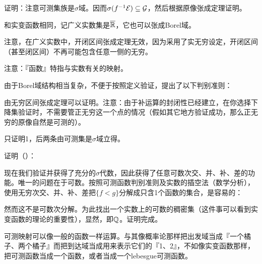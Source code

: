 证明：注意可测集族是$\sigma$域。因而$\sigma(f^{-1}\mbox{$\mathcal{E}$})\subseteq\mbox{$\mathcal{G}$}$，然后根据原像张成定理证明。


和实变函数相同，记广义实数集是$\overline{\mbox{$\mathbb R$}}$，它也可以张成Borel域。

注意，在广义实数中，开闭区间张成定理无效，因为采用了实无穷设定，开闭区间（甚至闭区间）不再可能包含任意一侧的无穷。

注意：『函数』特指与实数有关的映射。

由于Borel域结构相当复杂，不便于按照定义验证，提出了以下判别准则：

由无穷区间张成定理可以证明。注意：由于补运算的封闭性已经建立，在你选择下降集验证时，不需要管正无穷这一个点的情况（假如其它地方验证成功，那么正无穷的原像自然是可测的）。


只证明1，后两条由可测集是$\sigma$域立得。

证明（）：

现在我们验证并获得了充分的$\sigma$代数，因此获得了任意可数次交、并、补、差的功能。唯一的问题在于可数。按照可测函数判别准则及实数的插空法（数学分析），使用无穷次交、并、补、差把$\{f<g\}$分解成只含1个函数的集合，是容易的：


然而这不是可数次分解。为此找出一个实数上的可数的稠密集（这件事可以看到实变函数的理论的重要性），显然，即$\mbox{$\mathbb Q$}$。证明完成。




可测映射可以像一般的函数一样运算。与其像概率论那样把出发域当成『一个橘子、两个橘子』而把到达域当成用来表示它们的『1、2』，不如像实变函数那样，把可测函数当成一个函数，或者当成一个lebesgue可测函数。

